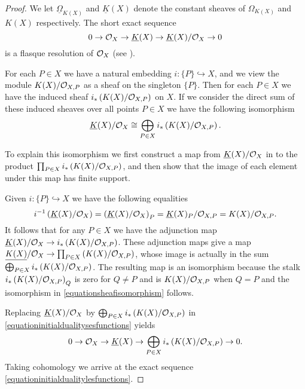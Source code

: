     \begin{proof}
    We let $\underline{\Omega}_{K(X)}$ and $\underline{K}(X)$ denote the constant sheaves of $\Omega_{K(X)}$ and $K(X)$ respectively.
    The short exact sequence
        \begin{equation}\label{equationinitialdualitysesfunctions}
        0 \rightarrow {\cal O}_X \rightarrow \underline{K}(X) \rightarrow \underline{K}(X)/{\cal O}_X \rightarrow 0
        \end{equation}
    is a flasque resolution of ${\cal O}_X$ (see \cite[Chap.\ II, ex.\ 1.16]{hart}).
    
    For each $P \in X$ we have a natural embedding $i\colon \{P\} \hookrightarrow X$, and we view the module $K(X)/{\cal O}_{X,P}$ as a sheaf on the singleton $\{P\}$.
    Then for each $P\in X$ we have the induced sheaf $i_*\left( K(X)/{\cal O}_{X,P} \right)$ on $X$.
    If we consider the direct sum of these induced sheaves over all points $P\in X$ we have the following isomorphism
        \begin{equation}\label{equationsheafisomorphism}
        \underline{K}(X)/{\cal O}_X\cong \bigoplus_{P\in X} i_*\left(K(X)/{\cal O}_{X,P}\right).
        \end{equation}
    
    
    To explain this isomorphism we first construct a map from $\underline{K}(X)/{\cal O}_X$ in to the product $\prod_{P \in X} i_*\left({K(X)}/{\cal O}_{X,P}\right)$, and then show that the image of each element under this map has finite support.
    
    Given $i\colon \{P\} \hookrightarrow X$ we have the following equalities
        \begin{equation*}
        i^{-1}\left(\underline{K}(X)/{\cal O}_X\right) = \left(\underline{K}(X)/{\cal O}_X\right)_P  = \underline{K}(X)_P/{\cal O}_{X,P}  = K(X)/{\cal O}_{X,P}.
        \end{equation*}
    It follows that for any $P \in X$ we have the adjunction map $\underline{K}(X)/{\cal O}_X \rightarrow i_* \left( K(X)/{\cal O}_{X,P} \right)$.
    These adjunction maps give a map $\underline{K(X)}/{\cal O}_X \rightarrow \prod_{P \in X}\left( K(X)/{\cal O}_{X,P} \right)$, whose image is actually in the sum $\bigoplus_{P \in X} i_*\left(K(X)/{\cal O}_{X,P} \right)$.
    The resulting map is an isomorphism because the stalk $i_*\left( K(X)/{\cal O}_{X,P} \right)_Q$ is zero for $Q \neq P$ and is $K(X)/{\cal O}_{X,P}$ when $Q = P$ and the isomorphism in \eqref{equationsheafisomorphism} follows.
    
    Replacing $\underline{K}(X)/{\cal O}_X$ by $\bigoplus_{P\in X} i_*\left(K(X)/{\cal O}_{X,P}\right)$ in \eqref{equationinitialdualitysesfunctions} yields
        \begin{equation}\label{equationshortexactsequencefunctionsdirectsum}
        0 \rightarrow {\cal O}_X \rightarrow \underline{K}(X) \rightarrow \bigoplus_{P \in X}i_* \left( K(X)/{\cal O}_{X,P} \right) \rightarrow 0.
        \end{equation}
    Taking cohomology we arrive at the exact sequence \eqref{equationinitialdualitylesfunctions}.
    

\end{proof}
